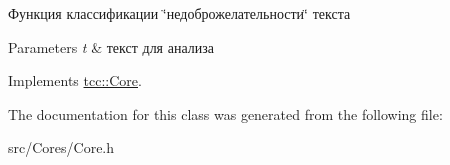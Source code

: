 Функция классификации \char`\"{}недоброжелательности\char`\"{} текста 


\begin{DoxyParams}{Parameters}
{\em t} & текст для анализа \\
\hline
\end{DoxyParams}


Implements \hyperlink{classtcc_1_1_core_ad7e147dffd871263238079485cfc33e0}{tcc\+::\+Core}.



The documentation for this class was generated from the following file\+:\begin{DoxyCompactItemize}
\item 
src/\+Cores/Core.\+h\end{DoxyCompactItemize}
